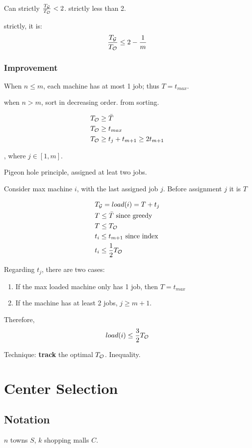 \documentclass[a4paper]{report}
\theoremstyle{definition}
\begin{document}
Can strictly $\frac{T_{\mathcal{G}}}{T_{\mathcal{O}}}<2$. strictly less than 2.

strictly, it is:
$$
\frac{T_{\mathcal{G}}}{T_{\mathcal{O}}} \leq 2-\frac{1}{m}
$$

\subsubsection{Improvement}
When $n\leq m$, each machine has at most 1 job; thus $T=t_{max}$.

when $n>m$, sort in decreasing order.  from sorting. 

\begin{align*}
& T_{\mathcal{O}} \geq \bar T \\
& T_{\mathcal{O}} \geq t_{max} \\
& T_{\mathcal{O}} \geq t_j + t_{m+1} \geq 2t_{m+1} \\
\end{align*}

, where $j\in[1, m]$.

Pigeon hole principle, assigned at leat two jobs.

Consider max machine $i$, with the last assigned job $j$. Before assignment $j$ it is $T$

\begin{align*}
& T_{\mathcal{G}}=load(i) = T+t_j\\
& T \leq \bar T \text{ since greedy}\\
& T \leq T_{\mathcal{O}} \\
& t_i \leq t_{m+1} \text{ since index} \\
& t_i \leq \frac{1}{2}T_{\mathcal{O}}
\end{align*}

Regarding $t_j$, there are two cases:
\begin{enumerate}
\item If the max loaded machine only has 1 job, then $T = t_{max}$
\item If the machine has at least 2 jobs, $j\geq m+1$.
\end{enumerate}

Therefore,
$$load(i)\leq \frac{3}{2} T_{\mathcal{O}}$$

Technique: \textbf{track} the optimal $T_{\mathcal{O}}$. Inequality.

\section{Center Selection}
\subsection{Notation}
$n$ towns $S$, $k$ shopping malls $C$.
\end{document}
